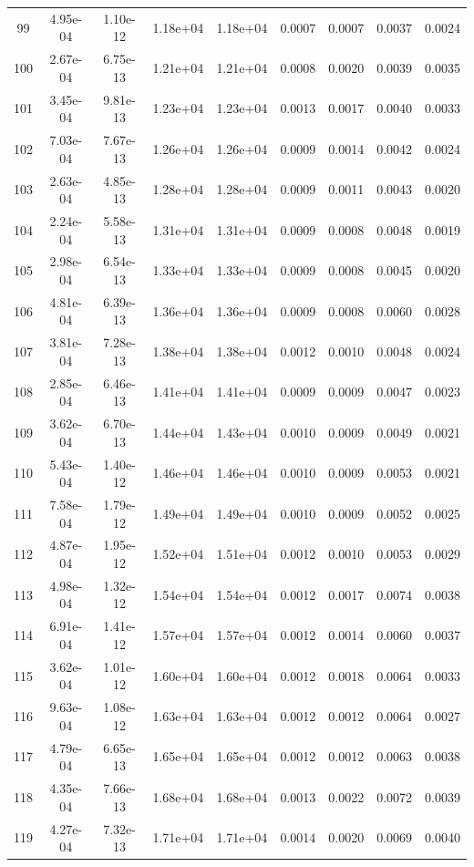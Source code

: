 \begin{longtable}{ccccccccc}
99 & 4.95e-04 & 1.10e-12 & 1.18e+04 & 1.18e+04 & 0.0007 & 0.0007 & 0.0037 & 0.0024 \\
100 & 2.67e-04 & 6.75e-13 & 1.21e+04 & 1.21e+04 & 0.0008 & 0.0020 & 0.0039 & 0.0035 \\
101 & 3.45e-04 & 9.81e-13 & 1.23e+04 & 1.23e+04 & 0.0013 & 0.0017 & 0.0040 & 0.0033 \\
102 & 7.03e-04 & 7.67e-13 & 1.26e+04 & 1.26e+04 & 0.0009 & 0.0014 & 0.0042 & 0.0024 \\
103 & 2.63e-04 & 4.85e-13 & 1.28e+04 & 1.28e+04 & 0.0009 & 0.0011 & 0.0043 & 0.0020 \\
104 & 2.24e-04 & 5.58e-13 & 1.31e+04 & 1.31e+04 & 0.0009 & 0.0008 & 0.0048 & 0.0019 \\
105 & 2.98e-04 & 6.54e-13 & 1.33e+04 & 1.33e+04 & 0.0009 & 0.0008 & 0.0045 & 0.0020 \\
106 & 4.81e-04 & 6.39e-13 & 1.36e+04 & 1.36e+04 & 0.0009 & 0.0008 & 0.0060 & 0.0028 \\
107 & 3.81e-04 & 7.28e-13 & 1.38e+04 & 1.38e+04 & 0.0012 & 0.0010 & 0.0048 & 0.0024 \\
108 & 2.85e-04 & 6.46e-13 & 1.41e+04 & 1.41e+04 & 0.0009 & 0.0009 & 0.0047 & 0.0023 \\
109 & 3.62e-04 & 6.70e-13 & 1.44e+04 & 1.43e+04 & 0.0010 & 0.0009 & 0.0049 & 0.0021 \\
110 & 5.43e-04 & 1.40e-12 & 1.46e+04 & 1.46e+04 & 0.0010 & 0.0009 & 0.0053 & 0.0021 \\
111 & 7.58e-04 & 1.79e-12 & 1.49e+04 & 1.49e+04 & 0.0010 & 0.0009 & 0.0052 & 0.0025 \\
112 & 4.87e-04 & 1.95e-12 & 1.52e+04 & 1.51e+04 & 0.0012 & 0.0010 & 0.0053 & 0.0029 \\
113 & 4.98e-04 & 1.32e-12 & 1.54e+04 & 1.54e+04 & 0.0012 & 0.0017 & 0.0074 & 0.0038 \\
114 & 6.91e-04 & 1.41e-12 & 1.57e+04 & 1.57e+04 & 0.0012 & 0.0014 & 0.0060 & 0.0037 \\
115 & 3.62e-04 & 1.01e-12 & 1.60e+04 & 1.60e+04 & 0.0012 & 0.0018 & 0.0064 & 0.0033 \\
116 & 9.63e-04 & 1.08e-12 & 1.63e+04 & 1.63e+04 & 0.0012 & 0.0012 & 0.0064 & 0.0027 \\
117 & 4.79e-04 & 6.65e-13 & 1.65e+04 & 1.65e+04 & 0.0012 & 0.0012 & 0.0063 & 0.0038 \\
118 & 4.35e-04 & 7.66e-13 & 1.68e+04 & 1.68e+04 & 0.0013 & 0.0022 & 0.0072 & 0.0039 \\
119 & 4.27e-04 & 7.32e-13 & 1.71e+04 & 1.71e+04 & 0.0014 & 0.0020 & 0.0069 & 0.0040 \\

\end{longtable}
